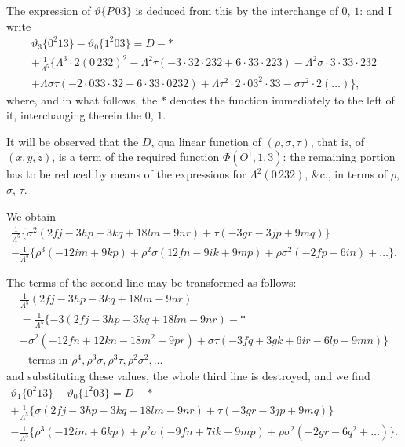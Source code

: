 \documentclass[11pt,a4paper]{book}
\begin{document}
\begin{art}\label{art:68}
The expression of $\vartheta\{P\,03\}$ is deduced from this by the interchange of $0$, $1$: and I write
\begin{multline*}
\vartheta_3\{0^2 13\} - \vartheta_0\{1^2 03\} = D - * \\
+ \frac{1}{\Lambda^5}\{\Lambda^3 \cdot 2(0\,232)^2 - \Lambda^2\tau(-3 \cdot 32 \cdot 232 + 6 \cdot 33 \cdot 223) - \Lambda^2\sigma \cdot 3 \cdot 33 \cdot 232 \\
+ \Lambda\sigma\tau(-2 \cdot 033 \cdot 32 + 6 \cdot 33 \cdot 0232) + \Lambda\tau^2 \cdot 2 \cdot 03^2 \cdot 33 - \sigma\tau^2 \cdot 2(\ldots)\},
\end{multline*}
where, and in what follows, the $*$ denotes the function immediately to the left of it, interchanging therein the $0$, $1$.
\end{art}

\newpage
\begin{art}\label{art:69}
It will be observed that the $D$, qua linear function of $(\rho, \sigma, \tau)$, that is, of $(x, y, z)$, is a term of the required function $\Phi(O^1, 1, 3)$: the remaining portion has to be reduced by means of the expressions for $\Lambda^2(0\,232)$, \&c., in terms of $\rho$, $\sigma$, $\tau$.
\end{art}

\begin{art}\label{art:70}
We obtain
\begin{multline*}
\frac{1}{\Lambda^5}\{\sigma^2(2fj - 3hp - 3kq + 18lm - 9nr) + \tau(-3gr - 3jp + 9mq)\} \\
- \frac{1}{\Lambda^5}\{\rho^3(-12im + 9kp) + \rho^2\sigma(12fn - 9ik + 9mp) + \rho\sigma^2(-2fp - 6in) + \ldots\}.
\end{multline*}
\end{art}

\begin{art}\label{art:71}
The terms of the second line may be transformed as follows:
\begin{multline*}
\frac{1}{\Lambda^5}(2fj - 3hp - 3kq + 18lm - 9nr) \\
= \frac{1}{\Lambda^5}\{-3(2fj - 3hp - 3kq + 18lm - 9nr) - * \\
+ \sigma^2(-12fn + 12kn - 18m^2 + 9pr) + \sigma\tau(-3fq + 3gk + 6ir - 6lp - 9mn)\} \\
+ \text{terms in } \rho^4, \rho^3\sigma, \rho^3\tau, \rho^2\sigma^2, \ldots
\end{multline*}
and substituting these values, the whole third line is destroyed, and we find
\begin{multline*}
\vartheta_1\{0^2 13\} - \vartheta_0\{1^2 03\} = D - * \\
+ \frac{1}{\Lambda^5}\{\sigma(2fj - 3hp - 3kq + 18lm - 9nr) + \tau(-3gr - 3jp + 9mq)\} \\
- \frac{1}{\Lambda^5}\{\rho^3(-12im + 6kp) + \rho^2\sigma(-9fn + 7ik - 9mp) + \rho\sigma^2(-2gr - 6q^2 + \ldots)\}.
\end{multline*}
\end{art}
\end{document}
